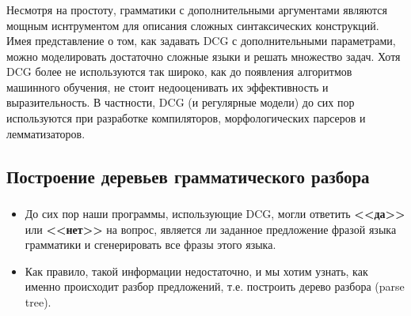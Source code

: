 

\begin{frame}

	\frametitle{\insertsection}
	\framesubtitle{\insertsubsection}
	
	Несмотря на простоту, грамматики с дополнительными аргументами являются мощным иснтрументом для описания сложных синтаксических конструкций.
	Имея представление о том, как задавать DCG с дополнительными параметрами, можно моделировать достаточно сложные языки и решать множество задач.
	Хотя DCG более не используются так широко, как до появления алгоритмов машинного обучения, не стоит недооценивать их эффективность и выразительность.
	В частности, DCG (и регулярные модели) до сих пор используются при разработке компиляторов, морфологических парсеров и лемматизаторов.
	
\end{frame}


\subsection{Построение деревьев грамматического разбора}


\begin{frame}

	\frametitle{\insertsection}
	\framesubtitle{\insertsubsection}
	
	\begin{itemize}
		\item До сих пор наши программы, использующие DCG, могли ответить \textbf{<<да>>} или \textbf{<<нет>>} на вопрос, является ли заданное предложение фразой языка грамматики и сгенерировать все фразы этого языка.
		\item Как правило, такой информации недостаточно, и мы хотим узнать, как именно происходит разбор предложений, т.е. построить дерево разбора (parse tree).
	\end{itemize}

\end{frame}


